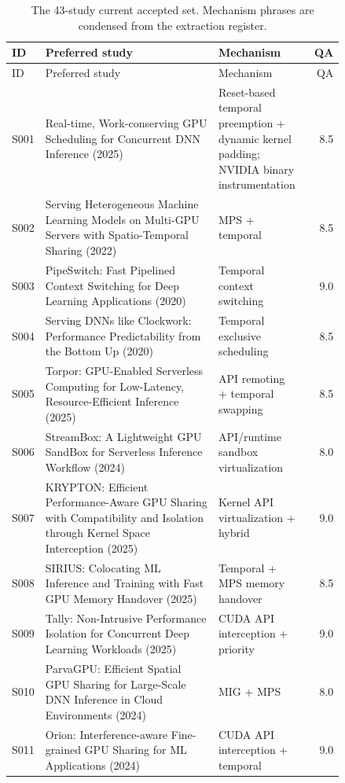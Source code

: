\begin{longtable}{P{0.105\linewidth}P{0.52\linewidth}P{0.22\linewidth}r}
\caption{The 43-study current accepted set. Mechanism phrases are condensed from the extraction register.}\\
\toprule ID & Preferred study & Mechanism & QA\\\midrule\endfirsthead
\toprule ID & Preferred study & Mechanism & QA\\\midrule\endhead
S001 & Real-time, Work-conserving GPU Scheduling for Concurrent DNN Inference (2025) \cite{reef} & Reset-based temporal preemption + dynamic kernel padding; NVIDIA binary instrumentation & 8.5 \\
S002 & Serving Heterogeneous Machine Learning Models on Multi-GPU Servers with Spatio-Temporal Sharing (2022) \cite{gpulet} & MPS + temporal & 8.5 \\
S003 & PipeSwitch: Fast Pipelined Context Switching for Deep Learning Applications (2020) \cite{pipeswitch} & Temporal context switching & 9.0 \\
S004 & Serving DNNs like Clockwork: Performance Predictability from the Bottom Up (2020) \cite{clockwork} & Temporal exclusive scheduling & 8.5 \\
S005 & Torpor: GPU-Enabled Serverless Computing for Low-Latency, Resource-Efficient Inference (2025) \cite{torpor} & API remoting + temporal swapping & 8.5 \\
S006 & StreamBox: A Lightweight GPU SandBox for Serverless Inference Workflow (2024) \cite{streambox} & API/runtime sandbox virtualization & 8.0 \\
S007 & KRYPTON: Efficient Performance-Aware GPU Sharing with Compatibility and Isolation through Kernel Space Interception (2025) \cite{krypton} & Kernel API virtualization + hybrid & 9.0 \\
S008 & SIRIUS: Colocating ML Inference and Training with Fast GPU Memory Handover (2025) \cite{sirius} & Temporal + MPS memory handover & 8.5 \\
S009 & Tally: Non-Intrusive Performance Isolation for Concurrent Deep Learning Workloads (2025) \cite{tally} & CUDA API interception + priority & 9.0 \\
S010 & ParvaGPU: Efficient Spatial GPU Sharing for Large-Scale DNN Inference in Cloud Environments (2024) \cite{parva} & MIG + MPS & 8.0 \\
S011 & Orion: Interference-aware Fine-grained GPU Sharing for ML Applications (2024) \cite{orion} & CUDA API interception + temporal & 9.0 \\

\end{longtable}
